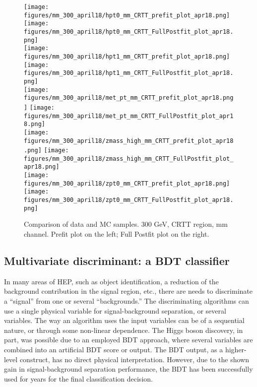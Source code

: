\begin{figure}[H]
\begin{center}
\texttt{[image: figures/mm\_300\_april18/hpt0\_mm\_CRTT\_prefit\_plot\_apr18.png]}
\texttt{[image: figures/mm\_300\_april18/hpt0\_mm\_CRTT\_FullPostfit\_plot\_apr18.png]}\\
\texttt{[image: figures/mm\_300\_april18/hpt1\_mm\_CRTT\_prefit\_plot\_apr18.png]}
\texttt{[image: figures/mm\_300\_april18/hpt1\_mm\_CRTT\_FullPostfit\_plot\_apr18.png]}\\
\texttt{[image: figures/mm\_300\_april18/met\_pt\_mm\_CRTT\_prefit\_plot\_apr18.png]}
\texttt{[image: figures/mm\_300\_april18/met\_pt\_mm\_CRTT\_FullPostfit\_plot\_apr18.png]}\\
\texttt{[image: figures/mm\_300\_april18/zmass\_high\_mm\_CRTT\_prefit\_plot\_apr18.png]}
\texttt{[image: figures/mm\_300\_april18/zmass\_high\_mm\_CRTT\_FullPostfit\_plot\_apr18.png]}\\
\texttt{[image: figures/mm\_300\_april18/zpt0\_mm\_CRTT\_prefit\_plot\_apr18.png]}
\texttt{[image: figures/mm\_300\_april18/zpt0\_mm\_CRTT\_FullPostfit\_plot\_apr18.png]}\\
\caption[Data-MC comparison in CRTT, other variables.]{Comparison of data and MC samples. 300 GeV, CRTT region, mm channel. Prefit plot on the left; Full Postfit plot on the right.}
\label{MCcomparisons_mm_low_CRTT_2}
\end{center}
\end{figure}

\subsection{Multivariate discriminant: a BDT classifier}

In many areas of HEP, such as object identification, a reduction of the background contribution in the signal region, etc., there are needs to discriminate a ``signal'' from one or several ``backgrounds.'' The discriminating algorithms can use a single physical variable for signal-background separation, or several variables. The way an algorithm uses the input variables can be of a sequential nature, or through some non-linear dependence. The Higgs boson discovery, in part, was possible due to an employed BDT approach, where several variables are combined into an artificial BDT score or output. The BDT output, as a higher-level construct, has no direct physical interpretation. However, due to the shown gain in signal-background separation performance, the BDT has been successfully used for years for the final classification decision. 


